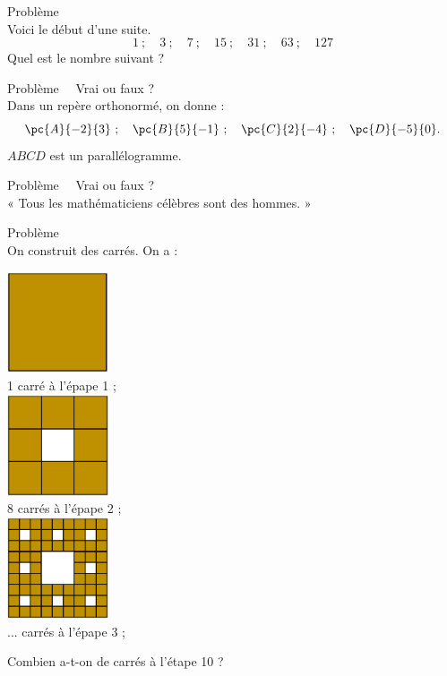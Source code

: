 \documentclass[a4paper,11pt,exos]{nsi} %
\newcounter{pbNum}
\newcommand{\pb}[1]
{
	\addtocounter{pbNum}{1}
	{\titlefont\color{UGLiBlue}\Large Problème\ \thepbNum\ \normalsize{#1}}\smallskip	
}
\begin{document}
\maketitle

\pb{}\\
Voici le début d'une suite.
$$1\ ;\quad 3\ ;\quad 7\ ;\quad 15\ ;\quad 31\ ;\quad 63\ ;\quad 127$$ 
Quel est le nombre suivant ?\\


\pb{ Vrai ou faux ?}\\
Dans un repère orthonormé, on donne :
$$\pc{A}{-2}{3}\ ;\quad \pc{B}{5}{-1}\ ;\quad \pc{C}{2}{-4}\ ;\quad \pc{D}{-5}{0}.$$
$ABCD$ est un parallélogramme.\\

\pb{ Vrai ou faux ?}\\
« Tous les mathématiciens célèbres sont des hommes. »\\

\pb{}\\
On construit des carrés. On a :
\begin{multicols}{3}
    \includegraphics[width=3cm]{carre1}\\
    1 carré à l'épape 1 ;\\
    \includegraphics[width=3cm]{carre2}\\
    8 carrés à l'épape 2 ;\\
    \includegraphics[width=3cm]{carre3}\\
    ... carrés à l'épape 3 ;
\end{multicols}
Combien a-t-on de carrés à l'étape 10 ?\\
\end{document}

